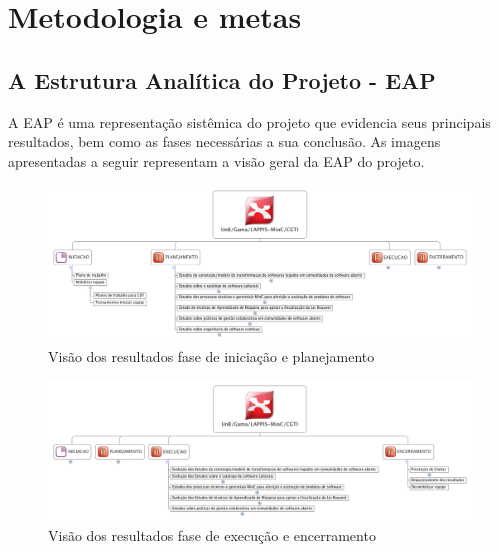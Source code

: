 \section{Metodologia e metas}
\subsection{A Estrutura Analítica do Projeto - EAP}

A EAP é uma representação sistêmica do projeto que evidencia seus principais 
resultados, bem como as fases necessárias a sua conclusão. As imagens 
apresentadas a seguir representam a visão geral da EAP do projeto.

\newpage
\begin{landscape}
\begin{figure}[]
\centering
\includegraphics[keepaspectratio=true,scale=0.55]{figuras/UnB-Gama-LAPPIS-MinC-CGTI-Ini-Plan.png}
\caption{Visão dos resultados fase de iniciação e planejamento}
\label{figura-eap_iniciação}
\end{figure}
\end{landscape}

\begin{landscape}
\begin{figure}[]
\centering
\includegraphics[keepaspectratio=true,scale=0.55]{figuras/UnB-Gama-LAPPIS-MinC-CGTI-Exec-Enc.png}
\caption{Visão dos resultados fase de execução e encerramento}
\label{figura-eap_planejamento}
\end{figure}
\end{landscape}


